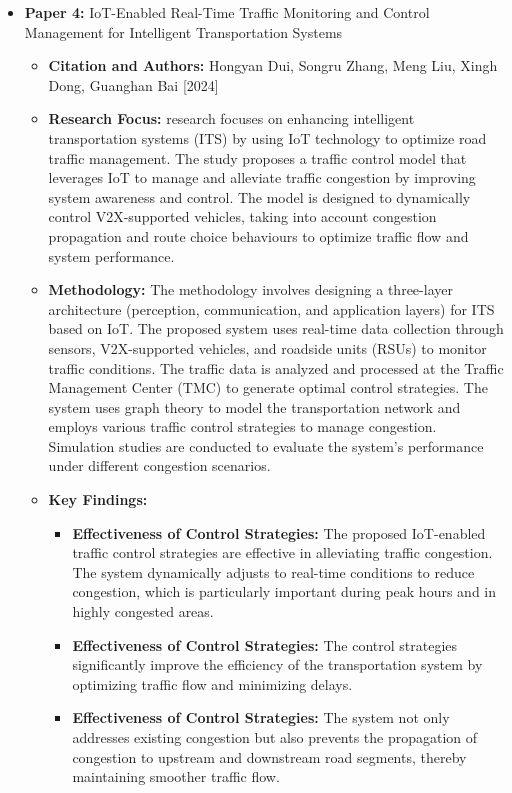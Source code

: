 \documentclass[12pt,a4paper]{article}
\begin{document}
\begin{itemize}
    \vspace{0.2cm}
    \item \textbf{Paper 4:}  IoT-Enabled Real-Time Traffic Monitoring and Control Management for Intelligent Transportation Systems
    
    \begin{itemize}
        \item \textbf{Citation and Authors:} Hongyan Dui, Songru Zhang, Meng Liu, Xingh Dong, Guanghan Bai [2024] 
        \item \textbf{Research Focus:} research focuses on enhancing intelligent transportation systems (ITS) by using IoT technology to optimize road traffic management. The study proposes a traffic control model that leverages IoT to manage and alleviate traffic congestion by improving system awareness and control. The model is designed to dynamically control V2X-supported vehicles, taking into account congestion propagation and route choice behaviours to optimize traffic flow and system performance.
        \item \textbf{Methodology:} The methodology involves designing a three-layer architecture (perception, communication, and application layers) for ITS based on IoT. The proposed system uses real-time data collection through sensors, V2X-supported vehicles, and roadside units (RSUs) to monitor traffic conditions. The traffic data is analyzed and processed at the Traffic Management Center (TMC) to generate optimal control strategies. The system uses graph theory to model the transportation network and employs various traffic control strategies to manage congestion. Simulation studies are conducted to evaluate the system's performance under different congestion scenarios.
        \item \textbf{Key Findings:} 
        \begin{itemize}
            \item \textbf{Effectiveness of Control Strategies: } The proposed IoT-enabled traffic control strategies are effective in alleviating traffic congestion. The system dynamically adjusts to real-time conditions to reduce congestion, which is particularly important during peak hours and in highly congested areas. 
            \item \textbf{Effectiveness of Control Strategies: } The control strategies significantly improve the efficiency of the transportation system by optimizing traffic flow and minimizing delays. 
            \item \textbf{Effectiveness of Control Strategies: } The system not only addresses existing congestion but also prevents the propagation of congestion to upstream and downstream road segments, thereby maintaining smoother traffic flow. 
        \end{itemize}
    \end{itemize}

\end{itemize}
\end{document}

